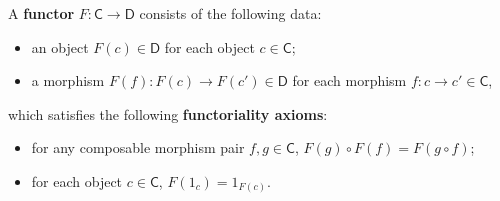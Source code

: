 \begin{defn} A \textbf{functor} $F:\mathsf{C}\rightarrow \mathsf{D}$ consists of the following data:
\begin{itemize}
\item an object $F(c)\in\mathsf{D}$ for each object $c\in \mathsf{C}$;
\item a morphism $F(f):F(c)\rightarrow F(c')\in \mathsf{D}$ for each morphism $f:c\rightarrow c'\in \mathsf{C}$,
\end{itemize}
which satisfies the following \textbf{functoriality axioms}:
\begin{itemize}
\item for any composable morphism pair $f,g\in\mathsf{C}$, $F(g)\circ F(f)=F(g\circ f)$;
\item for each object $c\in\mathsf{C}$, $F(1_c)=1_{F(c)}$.
\end{itemize}
\end{defn}
